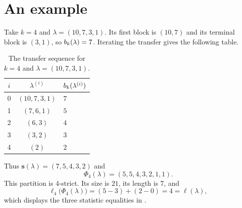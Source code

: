 \section{An example}\label{sec:example}

Take $k=4$ and $\lambda=(10,7,3,1)$. Its first block is $(10,7)$ and its
terminal block is $(3,1)$, so $b_k(\lambda)=7$. Iterating the transfer gives
the following table.

\begin{table}[H]
\centering
\caption{The transfer sequence for $k=4$ and $\lambda=(10,7,3,1)$.}
\label{tab:transfer-example}
\begin{tabular}{ccl}
\toprule
$i$ & $\lambda^{(i)}$ & $b_k(\lambda^{(i)})$ \\
\midrule
0 & $(10,7,3,1)$ & $7$ \\
1 & $(7,6,1)$ & $5$ \\
2 & $(6,3)$ & $4$ \\
3 & $(3,2)$ & $3$ \\
4 & $(2)$ & $2$ \\
\bottomrule
\end{tabular}
\end{table}

Thus $\mathbf{s}(\lambda)=(7,5,4,3,2)$ and
\begin{equation*}
 \Phi_4(\lambda)=(5,5,4,3,2,1,1).
\end{equation*}
This partition is $4$-strict. Its size is $21$, its length is $7$, and
\begin{equation*}
 \ell_4\bigl(\Phi_4(\lambda)\bigr)
 =(5-3)+(2-0)=4=\ell(\lambda),
\end{equation*}
which displays the three statistic equalities in .
